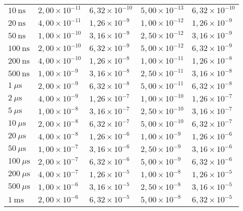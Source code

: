 \begin{table}[h!]
\begin{tabular}{l|l|l|l||l}
    \(10~\text{ns}\) & \(2,00\times 10^{-11}\) & \(6,32\times 10^{-10}\) & \(5,00\times 10^{-13}\) & \(6,32\times 10^{-10}\) \\
    \(20~\text{ns}\) & \(4,00\times 10^{-11}\) & \(1,26\times 10^{-9}\) & \(1,00\times 10^{-12}\) & \(1,26\times 10^{-9}\) \\
    \(50~\text{ns}\) & \(1,00\times 10^{-10}\) & \(3,16\times 10^{-9}\) & \(2,50\times 10^{-12}\) & \(3,16\times 10^{-9}\) \\
    \(100~\text{ns}\) & \(2,00\times 10^{-10}\) & \(6,32\times 10^{-9}\) & \(5,00\times 10^{-12}\) & \(6,32\times 10^{-9}\) \\
    \(200~\text{ns}\) & \(4,00\times 10^{-10}\) & \(1,26\times 10^{-8}\) & \(1,00\times 10^{-11}\) & \(1,26\times 10^{-8}\) \\
    \(500~\text{ns}\) & \(1,00\times 10^{-9}\) & \(3,16\times 10^{-8}\) & \(2,50\times 10^{-11}\) & \(3,16\times 10^{-8}\) \\
    \(1~\mu\text{s}\) & \(2,00\times 10^{-9}\) & \(6,32\times 10^{-8}\) & \(5,00\times 10^{-11}\) & \(6,32\times 10^{-8}\) \\
    \(2~\mu\text{s}\) & \(4,00\times 10^{-9}\) & \(1,26\times 10^{-7}\) & \(1,00\times 10^{-10}\) & \(1,26\times 10^{-7}\) \\
    \(5~\mu\text{s}\) & \(1,00\times 10^{-8}\) & \(3,16\times 10^{-7}\) & \(2,50\times 10^{-10}\) & \(3,16\times 10^{-7}\) \\
    \(10~\mu\text{s}\) & \(2,00\times 10^{-8}\) & \(6,32\times 10^{-7}\) & \(5,00\times 10^{-10}\) & \(6,32\times 10^{-7}\) \\
    \(20~\mu\text{s}\) & \(4,00\times 10^{-8}\) & \(1,26\times 10^{-6}\) & \(1,00\times 10^{-9}\) & \(1,26\times 10^{-6}\) \\
    \(50~\mu\text{s}\) & \(1,00\times 10^{-7}\) & \(3,16\times 10^{-6}\) & \(2,50\times 10^{-9}\) & \(3,16\times 10^{-6}\) \\
    \(100~\mu\text{s}\) & \(2,00\times 10^{-7}\) & \(6,32\times 10^{-6}\) & \(5,00\times 10^{-9}\) & \(6,32\times 10^{-6}\) \\
    \(200~\mu\text{s}\) & \(4,00\times 10^{-7}\) & \(1,26\times 10^{-5}\) & \(1,00\times 10^{-8}\) & \(1,26\times 10^{-5}\) \\
    \(500~\mu\text{s}\) & \(1,00\times 10^{-6}\) & \(3,16\times 10^{-5}\) & \(2,50\times 10^{-8}\) & \(3,16\times 10^{-5}\) \\
    \(1~\text{ms}\) & \(2,00\times 10^{-6}\) & \(6,32\times 10^{-5}\) & \(5,00\times 10^{-8}\) & \(6,32\times 10^{-5}\) \\

\end{tabular}
\end{table}
